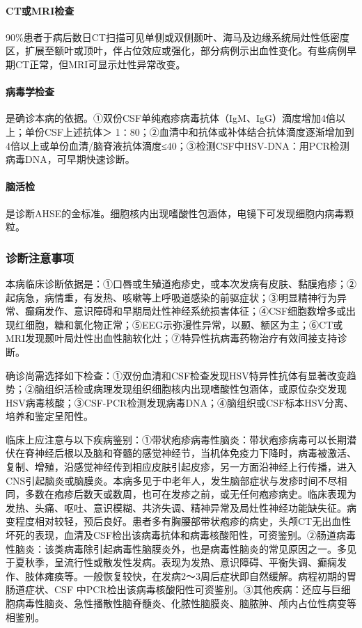 \paragraph{CT或MRI检查}

90\%患者于病后数日CT扫描可见单侧或双侧颞叶、海马及边缘系统局灶性低密度区，扩展至额叶或顶叶，伴占位效应或强化，部分病例示出血性变化。有些病例早期CT正常，但MRI可显示灶性异常改变。

\paragraph{病毒学检查}

是确诊本病的依据。①双份CSF单纯疱疹病毒抗体（IgM、IgG）滴度增加4倍以上；单份CSF上述抗体＞
1∶80；②血清中和抗体或补体结合抗体滴度逐渐增加到4倍以上或单份血清/脑脊液抗体滴度≤40；③检测CSF中HSV-DNA：用PCR检测病毒DNA，可早期快速诊断。

\paragraph{脑活检}

是诊断AHSE的金标准。细胞核内出现嗜酸性包涵体，电镜下可发现细胞内病毒颗粒。

\subsubsection{诊断注意事项}

本病临床诊断依据是：①口唇或生殖道疱疹史，或本次发病有皮肤、黏膜疱疹；②起病急，病情重，有发热、咳嗽等上呼吸道感染的前驱症状；③明显精神行为异常、癫痫发作、意识障碍和早期局灶性神经系统损害体征；④CSF细胞数增多或出现红细胞，糖和氯化物正常；⑤EEG示弥漫性异常，以颞、额区为主；⑥CT或MRI发现颞叶局灶性出血性脑软化灶；⑦特异性抗病毒药物治疗有效间接支持诊断。

确诊尚需选择如下检查：①双份血清和CSF检查发现HSV特异性抗体有显著改变趋势；②脑组织活检或病理发现组织细胞核内出现嗜酸性包涵体，或原位杂交发现HSV病毒核酸；③CSF-PCR检测发现病毒DNA；④脑组织或CSF标本HSV分离、培养和鉴定呈阳性。

临床上应注意与以下疾病鉴别：①带状疱疹病毒性脑炎：带状疱疹病毒可以长期潜伏在脊神经后根以及脑和脊髓的感觉神经节，当机体免疫力下降时，病毒被激活、复制、增殖，沿感觉神经传到相应皮肤引起皮疹，另一方面沿神经上行传播，进入CNS引起脑炎或脑膜炎。本病多见于中老年人，发生脑部症状与发疹时间不尽相同，多数在疱疹后数天或数周，也可在发疹之前，或无任何疱疹病史。临床表现为发热、头痛、呕吐、意识模糊、共济失调、精神异常及局灶性神经功能缺失征。病变程度相对较轻，预后良好。患者多有胸腰部带状疱疹的病史，头颅CT无出血性坏死的表现，血清及CSF检出该病毒抗体和病毒核酸阳性，可资鉴别。②肠道病毒性脑炎：该类病毒除引起病毒性脑膜炎外，也是病毒性脑炎的常见原因之一。多见于夏秋季，呈流行性或散发性发病。表现为发热、意识障碍、平衡失调、癫痫发作、肢体瘫痪等。一般恢复较快，在发病2～3周后症状即自然缓解。病程初期的胃肠道症状、CSF
中PCR检出该病毒核酸阳性可资鉴别。③其他疾病：还应与巨细胞病毒性脑炎、急性播散性脑脊髓炎、化脓性脑膜炎、脑脓肿、颅内占位性病变等相鉴别。

